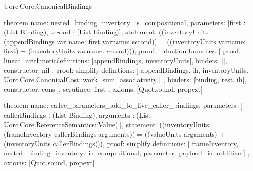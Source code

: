 \begin{lexlean}{Uorc.Core.CanonicalBindings}
\begin{semanticmodule}
theorem{
  name: nested_binding_inventory_is_compositional,
  parameters: [first : (List Binding), second : (List Binding)],
  statement: ((inventoryUnits (appendBindings var{
    name: first
  } var{name: second})) = ((inventoryUnits var{name: first}) + (inventoryUnits var{name: second}))),
  proof: induction{
    branches: [
      {
        proof: linear_arithmetic{definitions: [appendBindings, inventoryUnits]},
        binders: [],
        constructor: nil
      },
      {
        proof: simplify{
          definitions: [
            appendBindings,
            ih,
            inventoryUnits,
            Uorc.Core.CanonicalCost::work_sum_associativity
          ]
        },
        binders: [binding, rest, ih],
        constructor: cons
      }
    ],
    scrutinee: first
  },
  axioms: [Quot.sound, propext]
}

theorem{
  name: callee_parameters_add_to_live_caller_bindings,
  parameters: [
    callerBindings : (List Binding),
    arguments : (List Uorc.Core.ReferenceSemantics::Value)
  ],
  statement: ((inventoryUnits (frameInventory callerBindings arguments)) = ((valueUnits arguments) + (inventoryUnits callerBindings))),
  proof: simplify{
    definitions: [
      frameInventory,
      nested_binding_inventory_is_compositional,
      parameter_payload_is_additive
    ]
  },
  axioms: [Quot.sound, propext]
}
\end{semanticmodule}
\end{lexlean}
